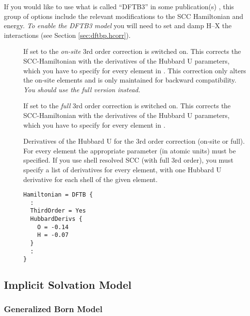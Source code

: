 If you would like to use what is called ``DFTB3'' in some publication(s)
\cite{gauss-jctc-7-931}, this group of options include the relevant
modifications to the SCC Hamiltonian and energy. \emph{To enable the DFTB3
  model} you will need to set  and damp H--X the
interactions (see Section \ref{sec:dftbp.hcorr}).

\begin{description}

\item[] If set to  the \textit{on-site} 3rd order
  correction \cite{yang-JPCA-111-10861} is switched on. This corrects the
  SCC-Hamiltonian with the derivatives of the Hubbard U parameters, which you
  have to specify for every element in . This correction only
  alters the on-site elements and is only maintained for backward
  compatibility. \emph{You should use the full version 
    instead.}

\item[] If set to  the \textit{full} 3rd order
  correction \cite{gauss-jctc-7-931} is switched on. This corrects the
  SCC-Hamiltonian with the derivatives of the Hubbard U parameters, which you
  have to specify for every element in .

\item[] Derivatives of the Hubbard U for the 3rd order
  correction (on-site or full). For every element the appropriate parameter (in
  atomic units) must be specified. If you use shell resolved SCC (with full
  3rd order), you must specify a list of derivatives for every element, with one
  Hubbard U derivative for each shell of the given element.
\begin{verbatim}
Hamiltonian = DFTB {
  :
  ThirdOrder = Yes
  HubbardDerivs {
    O = -0.14
    H = -0.07
  }
  :
}
\end{verbatim}
\end{description}

\subsection{Implicit Solvation Model}
\label{sec:dftbp.Solvation}

\subsubsection{Generalized Born Model}
\label{sec:dftbp.GeneralizedBorn}


